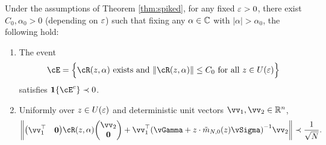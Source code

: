 \begin{lemma}\label{lemm:apply_fluctuation}
Under the assumptions of Theorem \ref{thm:spiked}, for any fixed $\varepsilon>0$,
there exist $C_0,\alpha_0>0$ (depending on $\varepsilon$) such that fixing any $\alpha
\in \mathbb{C}$ with $|\alpha|>\alpha_0$, the following hold:
\begin{enumerate}[label=(\alph*)]
\item The event
\[\cE=\Big\{\vcR(z,\alpha) \text{ exists and } \|\vcR(z,\alpha)\| \leq C_0
\text{ for all } z \in U(\eps)\Big\}\]
satisfies $\bI\{\cE^c\} \prec 0$.
\item Uniformly over $z \in U(\varepsilon)$
and deterministic unit vectors $\vv_1,\vv_2 \in \R^n$,
\begin{align}
\norm{   \begin{pmatrix}
    \vv_1^\top&\mathbf{0}
    \end{pmatrix}\vcR(z,\alpha)\begin{pmatrix}
    \vv_2\\
        \mathbf{0}
    \end{pmatrix}+  \vv_1^\top \left(\vGamma+z\cdot\tilde{m}_{N,0}(z)\vSigma
\right)^{-1}\vv_2 } \prec \frac{1}{\sqrt{N}}.
\end{align} 
\end{enumerate}
\end{lemma}

